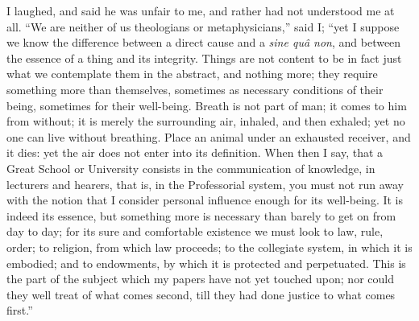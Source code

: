 I laughed, and said he was unfair to me, and rather had not
understood me at all. ``We are neither of us theologians or
metaphysicians,'' said I; ``yet I suppose we know the
difference between a direct cause and a \emph{sine quâ non}, and
between the essence of a thing and its integrity. Things are not
content to be in fact just what we contemplate them in the abstract,
and nothing more; they require something more than themselves, sometimes as necessary conditions of their being, sometimes for their
well-being. Breath is not part of man; it comes to him from without;
it is merely the surrounding air, inhaled, and then exhaled; yet no
one can live without breathing. Place an animal under an exhausted
receiver, and it dies: yet the air does not enter into its definition.
When then I say, that a Great School or University consists in the
communication of knowledge, in lecturers and hearers, that is, in the
Professorial system, you must not run away with the notion that I
consider personal influence enough for its well-being. It is indeed
its essence, but something more is necessary than barely to get on
from day to day; for its sure and comfortable existence we must look
to law, rule, order; to religion, from which law proceeds; to the
collegiate system, in which it is embodied; and to endowments, by
which it is protected and perpetuated. This is the part of the subject
which my papers have not yet touched upon; nor could they well treat
of what comes second, till they had done justice to what comes
first.''

